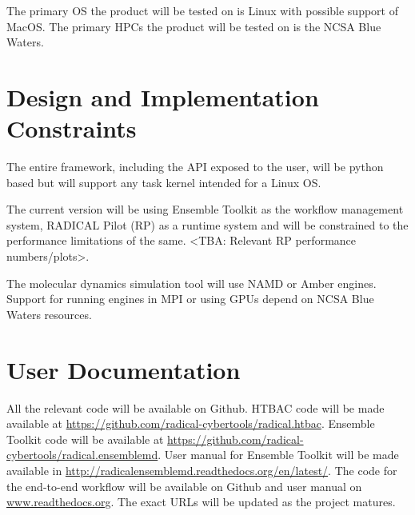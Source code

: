\documentclass{scrreprt}
\begin{document}
The primary OS the product will be tested on is Linux with possible support of MacOS. The primary HPCs the product will be tested on is the NCSA Blue Waters.

\section{Design and Implementation Constraints}

The entire framework, including the API exposed to the user, will be python based but will support any task kernel intended for a Linux OS.

The current version will be using Ensemble Toolkit as the workflow management system, RADICAL Pilot (RP) as a runtime system and will be constrained to the performance limitations of the same. <TBA: Relevant RP performance numbers/plots>.

The molecular dynamics simulation tool will use NAMD or Amber engines. Support for running engines in MPI or using GPUs depend on NCSA Blue Waters resources. 

\section{User Documentation}

All the relevant code will be available on Github. HTBAC code will be made available at \url{https://github.com/radical-cybertools/radical.htbac}. Ensemble Toolkit code will be available at \url{https://github.com/radical-cybertools/radical.ensemblemd}. User manual for Ensemble Toolkit will be made available in \url{http://radicalensemblemd.readthedocs.org/en/latest/}. The code for the end-to-end workflow will be available on Github and user manual on \url{www.readthedocs.org}. The exact URLs will be updated as the project matures.
\end{document}
